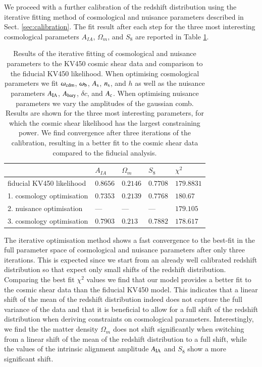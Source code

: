 \documentclass{aa}
\begin{document}
We proceed with a further calibration of the redshift distribution using the iterative fitting method of cosmological and nuisance parameters described in Sect. \ref{sec:calibration}. The fit result after each step for the three most interesting cosmological parameters $A_{IA}$, $\Omega_m$, and $S_8$ are reported in Table \ref{tab:iterative_calibration}. 
\begin{table}
\begin{tabular}{lllll}
& $A_{IA}$ & $\Omega_m$ & $S_8$ & $\chi^2$\\
\hline
\hline
fiducial KV450 likelihood & $0.8656$ & $0.2146$ & $0.7708$ & $179.8831$\\
\hline
1. cosmology optimisation & $0.7353$ & $0.2139$ & $0.7768$ & $180.67$\\
2. nuisance optimisation & --- & --- & --- & $179.105$\\
3. cosmology optimisation & $0.7903$ & $0.213$ & $0.7882$ & $178.617$\\
\end{tabular}
\caption{Results of the iterative fitting of cosmological and nuisance parameters to the KV450 cosmic shear data and comparison to the fiducial KV450 likelihood. When optimising cosmological parameters we fit $\omega_{\rm cdm}$, $\omega_{\rm b}$, $A_{\rm s}$, $n_{\rm s}$, and $h$ as well as the nuisance parameters $A_{\rm IA}$, $A_{\rm bary}$, $\delta c$, and $A_{\rm c}$. When optimising nuisance parameters we vary the amplitudes of the gaussian comb. Results are shown for the three most interesting parameters, for which the cosmic shear likelihood has the largest constraining power. We find convergence after three iterations of the calibration, resulting in a better fit to the cosmic shear data compared to the fiducial analysis.}
\label{tab:iterative_calibration}
\end{table}
The iterative optimisation method shows a fast convergence to the best-fit in the full parameter space of cosmological and nuisance parameters after only three iterations. This is expected since we start from an already well calibrated redshift distribution so that expect only small shifts of the redshift distribution. Comparing the best fit $\chi^2$ values we find that our model provides a better fit to the cosmic shear data than the fiducial KV450 model. This indicates that a linear shift of the mean of the redshift distribution indeed does not capture the full variance of the data and that it is beneficial to allow for a full shift of the redshift distribution when deriving constraints on cosmological parameters. Interestingly, we find the the matter density $\Omega_m$ does not shift significantly when switching from a linear shift of the mean of the redshift distribution to a full shift, while the values of the intrinsic alignment amplitude $A_{\rm IA}$ and $S_8$ show a more significant shift.
\end{document}
